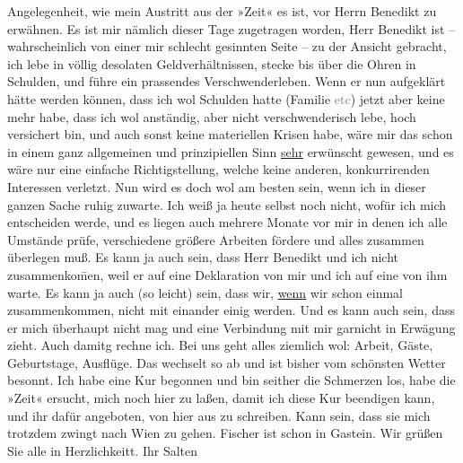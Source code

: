 \begin{ledgroupsized}[t]{13cm}
               Angelegenheit, wie mein Austritt aus der »Zeit« es ist,
               vor Herrn Benedikt zu erwähnen. Es ist mir nämlich
               dieser Tage zugetragen worden, Herr Benedikt ist –
               wahrscheinlich von einer mir schlecht gesinnten Seite – zu der Ansicht gebracht, ich
               lebe in völlig desolaten Geldverhältnissen, stecke bis über die Ohren in Schulden,
               und führe ein prassendes Verschwenderleben. Wenn er nun aufgeklärt hätte werden
               können, dass ich wol Schulden hatte (Familie \textcolor{gray}{etc}) jetzt aber keine
               mehr habe, dass ich wol anständig, aber nicht verschwenderisch lebe, hoch versichert
               bin, und auch sonst keine materiellen Krisen habe, wäre mir das schon in einem ganz
               allgemeinen und prinzipiellen Sinn \uline{sehr} erwünscht
               gewesen, und es wäre nur eine einfache Richtigstellung, welche keine anderen,
               konkurrirenden Interessen verletzt. Nun wird es doch wol am besten sein, wenn ich in
               dieser ganzen Sache ruhig zuwarte. Ich weiß ja heute selbst {\pb}noch nicht, wofür ich mich
               entscheiden werde, und es liegen auch mehrere Monate vor mir in denen ich alle
               Umstände prüfe, verschiedene größere Arbeiten fördere und alles zusammen überlegen
               muß. Es kann ja auch sein, dass Herr Benedikt und ich
               nicht zusammenkom̄en, weil er auf eine Deklaration von mir und ich auf eine von ihm
               warte. Es kann ja auch (so leicht) sein, dass wir, \uline{wenn} wir schon einmal zusammenkommen, nicht mit einander einig werden. Und
               es kann auch sein, dass er mich überhaupt nicht mag und eine Verbindung mit mir
               garnicht in Erwägung zieht. Auch damitg rechne ich. \pend
           \pstart
           Bei uns geht alles ziemlich wol: Arbeit, Gäste, Geburtstage, Ausflüge. Das wechselt
               so ab und ist bisher vom schönsten Wetter besonnt. Ich habe eine Kur begonnen und bin
               seither die Schmerzen los, habe die »Zeit« ersucht, mich
               noch hier zu laßen, damit ich diese Kur beendigen kann, und ihr dafür angeboten, von
               hier aus zu schreiben. Kann sein, dass sie mich trotzdem zwingt nach Wien zu gehen. Fischer ist schon
               in Gastein. Wir grüßen Sie alle in Herzlichkeitt. \pend
           \pstart Ihr \spacefill\mbox{Salten}\pend{}
         

\end{ledgroupsized}

